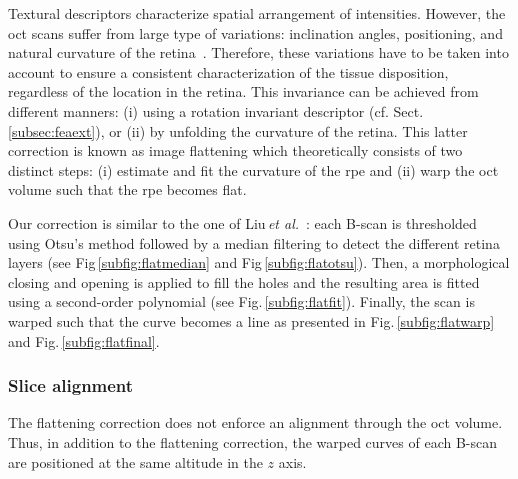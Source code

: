 Textural descriptors characterize spatial arrangement of intensities.
However, the \ac{oct} scans suffer from large type of variations: inclination angles, positioning, and natural curvature of the retina~\cite{Liu2011}.
Therefore, these variations have to be taken into account to ensure a consistent characterization of the tissue disposition, regardless of the location in the retina.
This invariance can be achieved from different manners: (i) using a rotation invariant descriptor (cf. Sect.\,\ref{subsec:feaext}), or (ii) by unfolding the curvature of the retina.
This latter correction is known as image flattening which theoretically consists of two distinct steps: (i) estimate and fit the curvature of the \ac{rpe} and (ii) warp the \ac{oct} volume such that the \ac{rpe} becomes flat.

Our correction is similar to the one of Liu\,\textit{et al.}~\cite{Liu2011}: each B-scan is thresholded using Otsu's method followed by a median filtering to detect the different retina layers (see Fig\,\ref{subfig:flatmedian} and Fig\,\ref{subfig:flatotsu}). 
Then, a morphological closing and opening is applied to fill the holes and the resulting area is fitted using a second-order polynomial (see Fig.\,\ref{subfig:flatfit}). 
Finally, the scan is warped such that the curve becomes a line as presented in Fig.\,\ref{subfig:flatwarp} and Fig.\,\ref{subfig:flatfinal}. 


\subsubsection{Slice alignment}
The flattening correction does not enforce an alignment through the \ac{oct} volume.
Thus, in addition to the flattening correction, the warped curves of each B-scan are positioned at the same altitude in the $z$ axis. 


